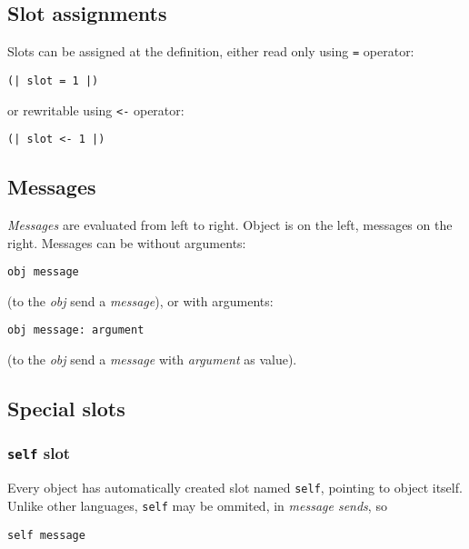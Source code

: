 \documentclass[10pt]{article}
\begin{document}
\begin{multicols*}{3}
\subsection{Slot assignments}

Slots can be assigned at the definition, either read only using \texttt{=} operator:

\begin{lstlisting}
(| slot = 1 |)
\end{lstlisting}

or rewritable using \texttt{<-} operator: %

\begin{lstlisting}
(| slot <- 1 |)
\end{lstlisting}




\subsection{Messages}

\textit{Messages} are evaluated from left to right. Object is on the left, messages on the right. Messages can be without arguments:

\begin{lstlisting}
obj message
\end{lstlisting}

(to the \textit{obj} send a \textit{message}), or with arguments:

\begin{lstlisting}
obj message: argument
\end{lstlisting}

(to the \textit{obj} send a \textit{message} with \textit{argument} as value).




\subsection{Special slots}

\subsubsection{\texttt{self} slot}
Every object has automatically created slot named \texttt{self}, pointing to object itself. Unlike other languages, \texttt{self} may be ommited, in \textit{message sends}, so

\begin{lstlisting}
self message
\end{lstlisting}


\end{multicols*}
\end{document}
